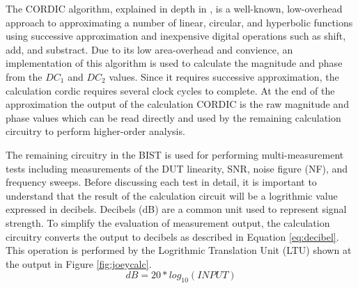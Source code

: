 \documentclass[12pt]{report}
\begin{document}
The CORDIC algorithm, explained in depth in \cite{joey}, is a well-known, low-overhead approach to approximating a number of linear, circular, and hyperbolic functions using successive approximation and inexpensive digital operations such as shift, add, and substract.  Due to its low area-overhead and convience, an implementation of this algorithm is used to calculate the magnitude and phase from the $DC_1$ and $DC_2$ values\cite{joey}.  Since it requires successive approximation, the calculation cordic requires several clock cycles to complete.  At the end of the approximation the output of the calculation CORDIC is the raw magnitude and phase values which can be read directly and used by the remaining calculation circuitry to perform higher-order analysis\cite{joey}.

The remaining circuitry in the BIST is used for performing multi-measurement tests including measurements of the DUT linearity, SNR, noise figure (NF), and frequency sweeps. Before discussing each test in detail, it is important to understand that the result of the calculation circuit will be a logrithmic value expressed in decibels.  Decibels (dB) are a common unit used to represent signal strength.  To simplify the evaluation of measurement output, the calculation circuitry converts the output to decibels as described in Equation \ref{eq:decibel}\cite{joey}.  This operation is performed by the Logrithmic Translation Unit (LTU) shown at the output in Figure \ref{fig:joeycalc}.  
\begin{equation}
dB = 20 * log_{10}(INPUT)
\label{eq:decibel}
\end{equation}
\end{document}

